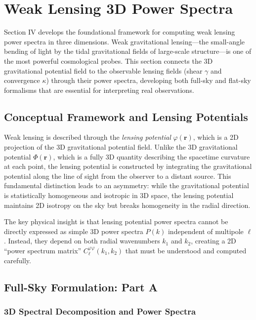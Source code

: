 \section{Weak Lensing 3D Power Spectra}

Section IV develops the foundational framework for computing weak lensing power spectra in three dimensions. Weak gravitational lensing—the small-angle bending of light by the tidal gravitational fields of large-scale structure—is one of the most powerful cosmological probes. This section connects the 3D gravitational potential field to the observable lensing fields (shear $\gamma$ and convergence $\kappa$) through their power spectra, developing both full-sky and flat-sky formalisms that are essential for interpreting real observations.

\subsection{Conceptual Framework and Lensing Potentials}

Weak lensing is described through the \emph{lensing potential} $\varphi(\mathbf{r})$, which is a 2D projection of the 3D gravitational potential field. Unlike the 3D gravitational potential $\Phi(\mathbf{r})$, which is a fully 3D quantity describing the spacetime curvature at each point, the lensing potential is constructed by integrating the gravitational potential along the line of sight from the observer to a distant source. This fundamental distinction leads to an asymmetry: while the gravitational potential is statistically homogeneous and isotropic in 3D space, the lensing potential maintains 2D isotropy on the sky but breaks homogeneity in the radial direction.

The key physical insight is that lensing potential power spectra cannot be directly expressed as simple 3D power spectra $P(k)$ independent of multipole $\ell$. Instead, they depend on both radial wavenumbers $k_1$ and $k_2$, creating a 2D ``power spectrum matrix'' $C_\ell^{\varphi\varphi}(k_1, k_2)$ that must be understood and computed carefully.

\subsection{Full-Sky Formulation: Part A}

\subsubsection{3D Spectral Decomposition and Power Spectra}

